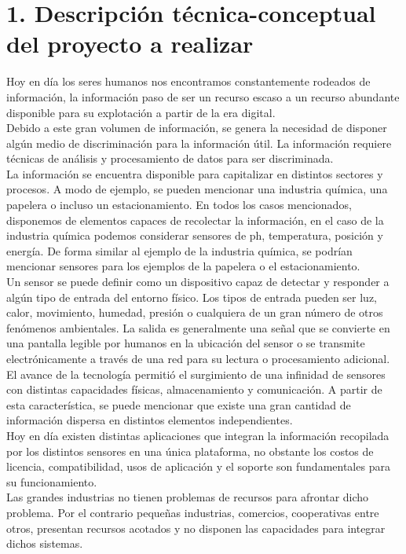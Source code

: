 \documentclass[
11pt, %
]{charter}
\begin{document}
\section{1. Descripción técnica-conceptual del proyecto a realizar}
\label{sec:descripcion}

Hoy en día los seres humanos nos encontramos constantemente rodeados de información, la información paso de ser un recurso escaso a un recurso abundante disponible para su explotación a partir de la era digital.\\
Debido a este gran volumen de información, se genera la necesidad de disponer algún medio de discriminación para la información útil. La información requiere técnicas de análisis y procesamiento de datos para ser discriminada. \\
La información se encuentra disponible para capitalizar en distintos sectores y procesos. 
A modo de ejemplo, se pueden mencionar una industria química, una papelera o incluso un estacionamiento.
En todos los casos mencionados, disponemos de elementos capaces de recolectar la información, en el caso de la industria química podemos considerar sensores de ph, temperatura, posición y energía. De forma similar al ejemplo de la industria química, se podrían mencionar sensores para los ejemplos de la papelera o el estacionamiento.\\
Un sensor se puede definir como un dispositivo capaz de detectar y responder a algún tipo de entrada del entorno físico. Los tipos de entrada pueden ser luz, calor, movimiento, humedad, presión o cualquiera de un gran número de otros fenómenos ambientales. La salida es generalmente una señal que se convierte en una pantalla legible por humanos en la ubicación del sensor o se transmite electrónicamente a través de una red para su lectura o procesamiento adicional. \\
El avance de la tecnología permitió el surgimiento de una infinidad de sensores con distintas capacidades físicas, almacenamiento y comunicación. A partir de esta característica, se puede mencionar que existe una gran cantidad de información dispersa en distintos elementos independientes.\\
 Hoy en día existen distintas aplicaciones que integran la información recopilada por los distintos sensores en una única plataforma, no obstante los costos de licencia, compatibilidad, usos de aplicación y el soporte son fundamentales para su funcionamiento.\\
 Las grandes industrias no tienen problemas de recursos para afrontar dicho problema. Por el contrario pequeñas industrias, comercios, cooperativas entre otros, presentan recursos acotados y no disponen las capacidades para integrar dichos sistemas.\\
\end{document}
